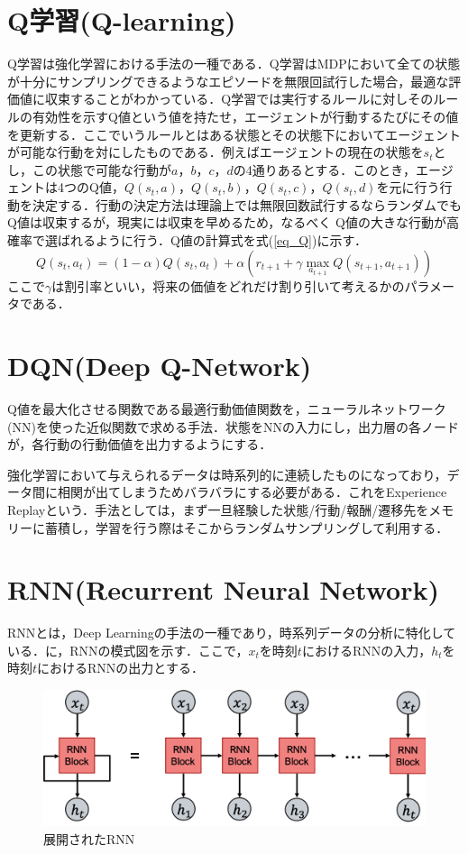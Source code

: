 \documentclass{eithesis}
\begin{document}
  \section{Q学習(Q-learning)}
    Q学習は強化学習における手法の一種である．Q学習はMDPにおいて全ての状態が十分にサンプリングできるようなエピソードを無限回試行した場合，最適な評価値に収束することがわかっている．Q学習では実行するルールに対しそのルールの有効性を示すQ値という値を持たせ，エージェントが行動するたびにその値を更新する．ここでいうルールとはある状態とその状態下においてエージェントが可能な行動を対にしたものである．例えばエージェントの現在の状態を$s_{t}$とし，この状態で可能な行動が$a$，$b$，$c$，$d$の4通りあるとする．このとき，エージェントは4つのQ値，$Q(s_{t},a)$，$Q(s_{t},b)$，$Q(s_{t},c)$，$Q(s_{t},d)$を元に行う行動を決定する．行動の決定方法は理論上では無限回数試行するならランダムでもQ値は収束するが，現実には収束を早めるため，なるべく Q値の大きな行動が高確率で選ばれるように行う．Q値の計算式を式(\ref{eq_Q})に示す．
    \begin{equation}\label{eq_Q}
      Q\left(s_{t}, a_{t}\right) = (1-\alpha) Q\left(s_{t}, a_{t}\right)+\alpha\left(r_{t+1}+\gamma \max _{a_{t+1}} Q\left(s_{t+1}, a_{t+1}\right)\right)
    \end{equation}
    ここで$\gamma$は割引率といい，将来の価値をどれだけ割り引いて考えるかのパラメータである．
  \section{DQN(Deep Q-Network)} \label{sec_dqn}
    Q値を最大化させる関数である最適行動価値関数を，ニューラルネットワーク(NN)を使った近似関数で求める手法．状態をNNの入力にし，出力層の各ノードが，各行動の行動価値を出力するようにする．

    強化学習において与えられるデータは時系列的に連続したものになっており，データ間に相関が出てしまうためバラバラにする必要がある．これをExperience Replayという．手法としては，まず一旦経験した状態/行動/報酬/遷移先をメモリーに蓄積し，学習を行う際はそこからランダムサンプリングして利用する．

  \section{RNN(Recurrent Neural Network)}
    RNNとは，Deep Learningの手法の一種であり，時系列データの分析に特化している．に，RNNの模式図を示す．ここで，$x_t$を時刻$t$におけるRNNの入力，$h_t$を時刻$t$におけるRNNの出力とする．
    \begin{figure}[htbp]
      \centering
      \includegraphics[width=14cm]{./images/RNN.png}
      \caption{展開されたRNN}
      \label{fig_RNN}
    \end{figure}
\end{document}
